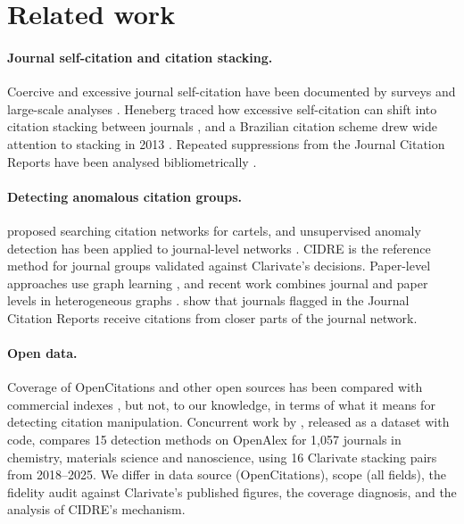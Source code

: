 \section{Related work}\label{sec:related}

\paragraph{Journal self-citation and citation stacking.}
Coercive and excessive journal self-citation have been documented by surveys and large-scale analyses
\citep{wilhite2012coercive,chorus2016coercive,taskin2021selfcitation}. Heneberg traced how excessive self-citation can
shift into citation stacking between journals \citep{heneberg2016stacking}, and a Brazilian citation scheme drew wide
attention to stacking in 2013 \citep{vannoorden2013brazil}. Repeated suppressions from the Journal Citation Reports
have been analysed bibliometrically \citep{moussa2022suppressed}.

\paragraph{Detecting anomalous citation groups.}
\citet{fister2016cartels} proposed searching citation networks for cartels, and unsupervised anomaly
detection has been applied to journal-level networks \citep{jolly2020anomaly}. CIDRE \citep{kojaku2021cidre} is the
reference method for journal groups validated against Clarivate's decisions. Paper-level approaches use graph learning
\citep{liu2022tnnls}, and recent work combines journal and paper levels in heterogeneous graphs \citep{liu2026isf}.
\citet{barnes2026distance} show that journals flagged in the Journal Citation Reports receive citations from closer parts of the
journal network.

\paragraph{Open data.}
Coverage of OpenCitations and other open sources has been compared with commercial indexes
\citep{martinmartin2021coverage,visser2021comparison,culbert2025openalex}, but not, to our knowledge, in terms of what it
means for detecting citation manipulation. Concurrent work by \citet{zhang2026openalex}, released as a dataset
with code, compares 15 detection methods on OpenAlex for 1,057 journals in chemistry, materials science and
nanoscience, using 16 Clarivate stacking pairs from 2018--2025. We differ in data source (OpenCitations), scope (all
fields), the fidelity audit against Clarivate's published figures, the coverage diagnosis, and the analysis of
CIDRE's mechanism.

